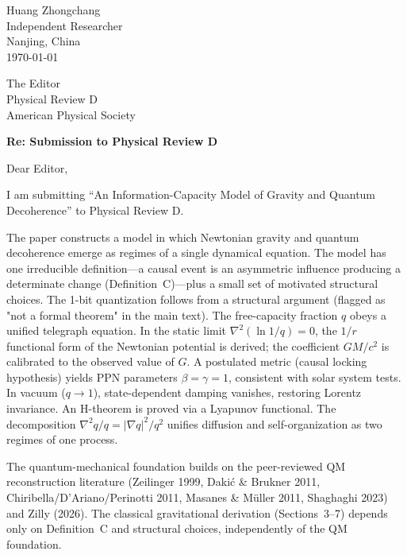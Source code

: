 \documentclass[12pt]{article}
\begin{document}
\begin{flushright}
Huang Zhongchang\\
Independent Researcher\\
Nanjing, China\\
\today
\end{flushright}

\vspace{0.3in}

\noindent The Editor\\
Physical Review D\\
American Physical Society

\vspace{0.2in}

\noindent \textbf{Re: Submission to Physical Review D}

\vspace{0.1in}

\noindent Dear Editor,

I am submitting ``An Information-Capacity Model of Gravity and Quantum Decoherence'' to Physical Review D.

The paper constructs a model in which Newtonian gravity and quantum decoherence emerge as regimes of a single dynamical equation. The model has one irreducible definition---a causal event is an asymmetric influence producing a determinate change (Definition~C)---plus a small set of motivated structural choices. The 1-bit quantization follows from a structural argument (flagged as "not a formal theorem" in the main text). The free-capacity fraction $q$ obeys a unified telegraph equation. In the static limit $\nabla^2(\ln 1/q)=0$, the $1/r$ functional form of the Newtonian potential is derived; the coefficient $GM/c^2$ is calibrated to the observed value of $G$. A postulated metric (causal locking hypothesis) yields PPN parameters $\beta=\gamma=1$, consistent with solar system tests. In vacuum ($q\to1$), state-dependent damping vanishes, restoring Lorentz invariance. An H-theorem is proved via a Lyapunov functional. The decomposition $\nabla^2 q/q=|\nabla q|^2/q^2$ unifies diffusion and self-organization as two regimes of one process.

The quantum-mechanical foundation builds on the peer-reviewed QM reconstruction literature (Zeilinger 1999, Daki\'c \& Brukner 2011, Chiribella/D'Ariano/Perinotti 2011, Masanes \& M\"uller 2011, Shaghaghi 2023) and Zilly (2026). The classical gravitational derivation (Sections~3--7) depends only on Definition~C and structural choices, independently of the QM foundation.
\end{document}

